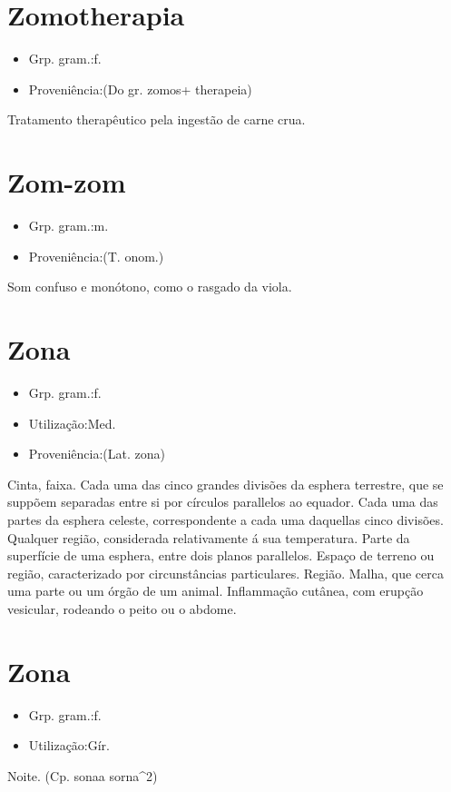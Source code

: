 \section{Zomotherapia}
\begin{itemize}
\item {Grp. gram.:f.}
\end{itemize}
\begin{itemize}
\item {Proveniência:(Do gr. \textunderscore zomos\textunderscore  + \textunderscore therapeia\textunderscore )}
\end{itemize}
Tratamento therapêutico pela ingestão de carne crua.
\section{Zom-zom}
\begin{itemize}
\item {Grp. gram.:m.}
\end{itemize}
\begin{itemize}
\item {Proveniência:(T. onom.)}
\end{itemize}
Som confuso e monótono, como o rasgado da viola.
\section{Zona}
\begin{itemize}
\item {Grp. gram.:f.}
\end{itemize}
\begin{itemize}
\item {Utilização:Med.}
\end{itemize}
\begin{itemize}
\item {Proveniência:(Lat. \textunderscore zona\textunderscore )}
\end{itemize}
Cinta, faixa.
Cada uma das cinco grandes divisões da esphera terrestre, que se suppõem separadas entre si por círculos parallelos ao equador.
Cada uma das partes da esphera celeste, correspondente a cada uma daquellas cinco divisões.
Qualquer região, considerada relativamente á sua temperatura.
Parte da superfície de uma esphera, entre dois planos parallelos.
Espaço de terreno ou região, caracterizado por circunstâncias particulares.
Região.
Malha, que cerca uma parte ou um órgão de um animal.
Inflammação cutânea, com erupção vesicular, rodeando o peito ou o abdome.
\section{Zona}
\begin{itemize}
\item {Grp. gram.:f.}
\end{itemize}
\begin{itemize}
\item {Utilização:Gír.}
\end{itemize}
Noite.
(Cp. \textunderscore sona\textunderscore  a \textunderscore sorna\textunderscore ^2)
